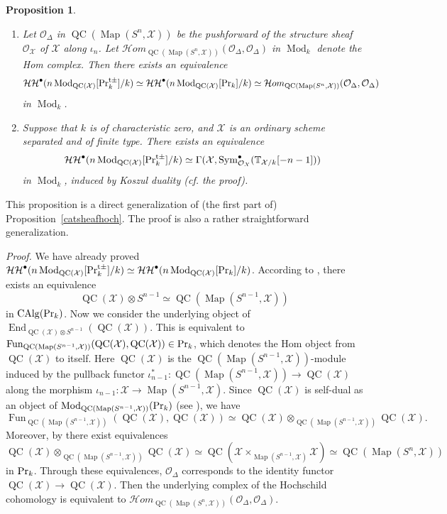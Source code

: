 \documentclass[leqno,12pt]{amsart}
\theoremstyle{plain}
\newtheorem{Proposition}[Theorem]{Proposition}
\theoremstyle{definition}
\newcommand{\HH}{\operatorname{\mathcal{HH}}}
\newcommand{\PR}{\textup{Pr}}
\newcommand{\PRTTT}{\textup{Pr}^{\textup{t}\pm}}
\newcommand{\OO}{{\mathcal{O}}}
\newcommand{\Mod}{\operatorname{Mod}}
\newcommand{\Map}{\operatorname{Map}}
\newcommand{\Fun}{\operatorname{Fun}}
\newcommand{\End}{\operatorname{End}}
\newcommand{\CAlg}{\operatorname{CAlg}}
\newcommand{\QC}{\operatorname{QC}}
\newcommand{\XX}{\mathcal{X}}
\newcommand{\Sym}{\operatorname{Sym}}
\newcommand{\Proof}{{\sl Proof.}\quad}
\begin{document}
\begin{Proposition}
\label{highercatprop}
\begin{enumerate}
\item Let $\OO_\Delta$ in $\QC(\Map(S^n,\mathcal{X}))$ be the pushforward of the structure sheaf $\OO_{\XX}$ of $\XX$ along $\iota_n$.
Let $\mathcal{H}om_{\QC(\Map(S^n,\mathcal{X}))}(\OO_{\Delta}, \OO_{\Delta})$ in $\Mod_k$ denote the Hom complex.
Then there exists an equivalence 
\[
\HH^\bullet(n\Mod_{\QC(\mathcal{X})}[\PRTTT_k]/k)\simeq \HH^\bullet(n\Mod_{\QC(\mathcal{X})}[\PR_k]/k)\simeq \mathcal{H}om_{\QC(\Map(S^n,\mathcal{X}))}(\OO_{\Delta}, \OO_{\Delta})
\]
in
$\Mod_k$.

\item
Suppose that $k$ is of characteristic zero, and $\XX$ is an ordinary scheme separated and of finite type.
There exists an equivalence
\[
\HH^\bullet(n\Mod_{\QC(\mathcal{X})}[\PRTTT_k]/k)\simeq  \Gamma(\XX,\Sym_{\OO_{\XX}}^{\bullet}(\mathbb{T}_{\XX/k}[-n-1]))
\]
in $\Mod_k$, induced by Koszul duality (cf. the proof).
\end{enumerate}
\end{Proposition}


This proposition is a direct generalization of (the first part of) Proposition~\ref{catsheafhoch}.
The proof is also a rather straightforward generalization.



\Proof
We have already proved $\HH^\bullet(n\Mod_{\QC(\mathcal{X})}[\PRTTT_k]/k)\simeq \HH^\bullet(n\Mod_{\QC(\mathcal{X})}[\PR_k]/k)$.
According to \cite[Theorem 4.7, Corollary 4.12]{BFN}, there exists an equivalence
\[
\QC(\mathcal{X})\otimes S^{n-1}\simeq \QC(\Map(S^{n-1},\mathcal{X}))
\]
in $\CAlg(\PR_k)$.
Now we consider the underlying object of $\End_{\QC(\mathcal{X})\otimes S^{n-1}}(\QC(\mathcal{X}))$.
This is equivalent to $\Fun_{\QC(\Map(S^{n-1},\mathcal{X}))}(\QC(\mathcal{X}), \QC(\mathcal{X}))\in \PR_k$, which denotes the Hom object from $\QC(\mathcal{X})$ to itself.
Here $\QC(\mathcal{X})$ is the $\QC(\Map(S^{n-1},\mathcal{X}))$-module induced by the pullback functor $\iota_{n-1}^*:\QC(\Map(S^{n-1},\mathcal{X}))\to \QC(\mathcal{X})$
along the morphism $\iota_{n-1}:\mathcal{X}\to \Map(S^{n-1},\mathcal{X})$.
Since $\QC(\mathcal{X})$ is self-dual as an object of $\Mod_{\QC(\Map(S^{n-1},\mathcal{X}))}(\PR_k)$ (see \cite[Corollary 4.8]{BFN}), we have
\[
\Fun_{\QC(\Map(S^{n-1},\mathcal{X}))}(\QC(\mathcal{X}), \QC(\mathcal{X}))\simeq \QC(\mathcal{X})\otimes_{\QC(\Map(S^{n-1},\mathcal{X}))}\QC(\mathcal{X}).
\]
Moreover, by \cite[Theorem 4.7]{BFN} there exist equivalences
\[
\QC(\mathcal{X})\otimes_{\QC(\Map(S^{n-1},\mathcal{X}))}\QC(\mathcal{X})\simeq \QC(\mathcal{X}\times_{\Map(S^{n-1},\mathcal{X})}\mathcal{X})\simeq \QC(\Map(S^n,\mathcal{X}))
\]
in $\PR_k$. Through these equivalences, $\OO_\Delta$ corresponds to the identity functor  $\QC(\mathcal{X})\to \QC(\mathcal{X})$.
Then the underlying complex of the Hochschild cohomology is equivalent to
$\mathcal{H}om_{\QC(\Map(S^n,\mathcal{X}))}(\OO_{\Delta}, \OO_{\Delta})$.
\end{document}
